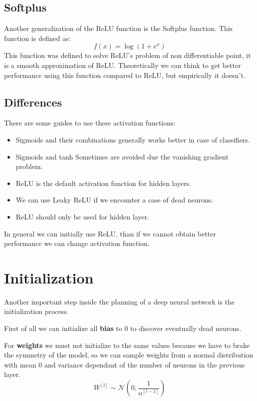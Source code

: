 \subsection{Softplus}
Another generalization of the ReLU function is the Softplus function. This function
is defined as:
\begin{equation}
    f(x) = \log(1+e^x)
\end{equation}
This function was defined to solve ReLU's problem of non differentiable point,
it is a smooth approximation of ReLU. Theoretically we can think to get better
performance using this function compared to ReLU, but empirically it doesn't.

\subsection{Differences}
There are some guides to use these activation functions:
\begin{itemize}
    \item Sigmoids and their combinations generally works better in case of classifiers.
    \item Sigmoids and tanh Sometimes are avoided due the vanishing gradient problem.
    \item ReLU is the default activation function for hidden layers.
    \item We can use Leaky ReLU if we encounter a case of dead neurons.
    \item ReLU should only be used for hidden layer.
\end{itemize}
In general we can initially use ReLU, than if we cannot obtain better performance
we can change activation function.
\section{Initialization}
Another important step inside the planning of a deep neural network is the
initialization process.

First of all we can initialize all \textbf{bias} to $0$ to discover eventually
dead neurons. %

For \textbf{weights} we must not initialize to the same values because we have to
brake the symmetry of the model, so we can sample weights from a normal
distribution with mean $0$ and variance dependant of the number of neurons in
the previous layer.
\begin{equation*}
    W^{[l]} \sim \mathcal{N}\left(0, \frac{1}{n^{[l-1]}}\right)
\end{equation*}
